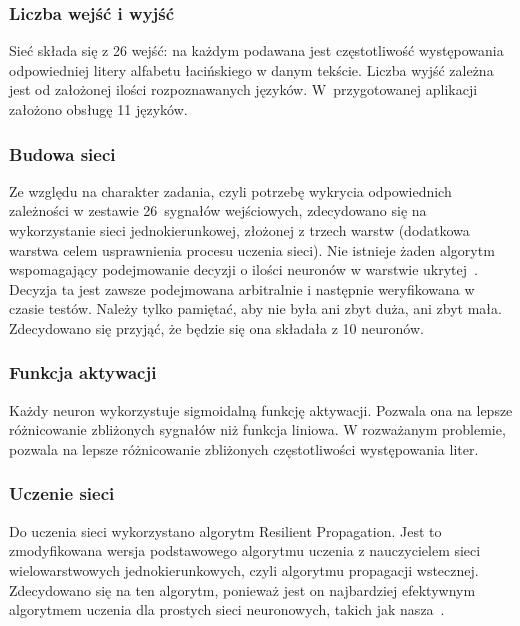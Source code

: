 \documentclass[journal]{IEEEtran}
\begin{document}
\subsubsection{Liczba wejść i wyjść}
Sieć składa się z 26 wejść: na każdym podawana jest częstotliwość występowania odpowiedniej litery alfabetu łacińskiego
w danym tekście. Liczba wyjść zależna jest od założonej ilości rozpoznawanych języków. W~przygotowanej aplikacji założono
obsługę 11 języków.

\subsubsection{Budowa sieci}
Ze względu na charakter zadania, czyli potrzebę wykrycia odpowiednich zależności w zestawie 26~sygnałów wejściowych,
zdecydowano się na wykorzystanie sieci jednokierunkowej, złożonej z trzech warstw (dodatkowa warstwa celem usprawnienia
procesu uczenia sieci). Nie istnieje żaden algorytm wspomagający podejmowanie decyzji o ilości neuronów w warstwie
ukrytej~\cite{tad:elem_wpr}. Decyzja ta jest zawsze podejmowana arbitralnie i następnie weryfikowana w czasie testów.
Należy tylko pamiętać, aby nie była ani zbyt duża, ani zbyt mała. Zdecydowano się przyjąć, że będzie się ona składała
z 10 neuronów.

\subsubsection{Funkcja aktywacji}
Każdy neuron wykorzystuje sigmoidalną funkcję aktywacji. Pozwala ona na lepsze różnicowanie zbliżonych sygnałów niż funkcja
liniowa. W rozważanym problemie, pozwala na lepsze różnicowanie zbliżonych częstotliwości występowania liter.

\subsubsection{Uczenie sieci}
Do uczenia sieci wykorzystano algorytm Resilient Propagation. Jest to zmodyfikowana wersja podstawowego algorytmu uczenia
z nauczycielem sieci wielowarstwowych jednokierunkowych, czyli algorytmu propagacji wstecznej. Zdecydowano się na ten
algorytm, ponieważ jest on najbardziej efektywnym algorytmem uczenia dla prostych sieci neuronowych, takich jak nasza~\cite{encog:rprop}.
\end{document}
